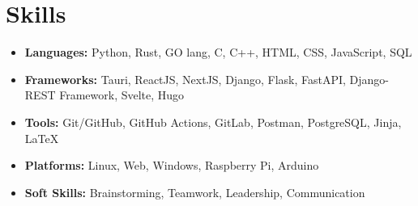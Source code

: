 \documentclass[legalpaper,10.8pt]{article}
\begin{document}
\section{Skills}
\begin{itemize}[leftmargin=*]
    \item \textbf{Languages:} Python, Rust, GO lang, C, C++, HTML, CSS, JavaScript, SQL
    \item \textbf{Frameworks:} Tauri, ReactJS, NextJS, Django, Flask, FastAPI, Django-REST Framework, Svelte, Hugo
    \item \textbf{Tools:} Git/GitHub, GitHub Actions, GitLab, Postman, PostgreSQL, Jinja, LaTeX
    \item \textbf{Platforms:} Linux, Web, Windows, Raspberry Pi, Arduino
    \item \textbf{Soft Skills:} Brainstorming, Teamwork, Leadership, Communication
\end{itemize}

\end{document}
